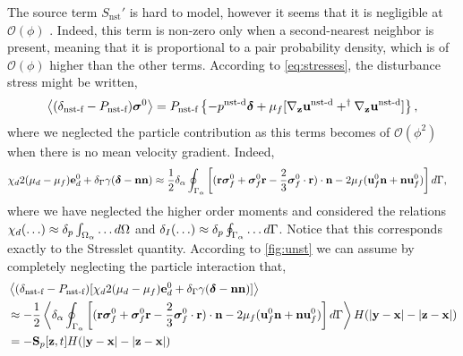 The source term $S_\text{nst}'$ is hard to model, however it seems that it is negligible at $\mathcal{O}(\phi)$ \citet{zhang2021ensemble}. 
Indeed, this term is non-zero only when a second-nearest neighbor is present, meaning that it is proportional to a pair probability density, which is of $\mathcal{O}(\phi)$ higher than the other terms. 
According to \ref{eq:stresses}, the disturbance stress might be written, 
\begin{equation}
    \left<(\delta_\text{nst-f} - P_\text{nst-f}) \bm\sigma^0\right>
    =
    P_\text{nst-f}\left\{
        -p^\text{nst-d}\bm\delta 
        + \mu_f [{\mathbf{\nabla}_\textbf{z}} \textbf{u}^\text{nst-d}+^\dagger{\mathbf{\nabla}_\textbf{z}} \textbf{u}^\text{nst-d}]
    \right\},
\end{equation}
where we  neglected the particle contribution as this terms becomes of $\mathcal{O}(\phi^2)$ when there is no mean velocity gradient. 
Indeed, 
\begin{align}
    {\chi_d  2 (\mu_d-\mu_f)\textbf{e}_d^0 
    + \delta_\Gamma \gamma (\bm\delta - \textbf{nn})}
    &\approx
    \frac{1}{2}
     \delta_\alpha\oint_{\Gamma_{\alpha}} 
        \left[(\textbf{r}\bm\sigma_f^0 
        + \bm\sigma_f^0 \textbf{r}
        - \frac{2}{3}\bm\sigma_f^0 \cdot \textbf{r}
        )\cdot \textbf{n} 
        - 2\mu_f (
            \textbf{u}_f^0 \textbf{n}
            + \textbf{n}\textbf{u}_f^0 
        )\right]
     d\Gamma,
\end{align}
where we have neglected the higher order moments and considered the relations $\chi_d(\ldots) \approx \delta_p \int_{\Omega_{\alpha}} \ldots d\Omega$ and $\delta_I(\ldots) \approx \delta_p \oint_{\Gamma_{\alpha}} \ldots d\Gamma$. 
Notice that this corresponds exactly to the Stresslet quantity. 
According to \ref{fig:unst} we can assume by completely neglecting the particle interaction that, 
\begin{align}
    &\left<(\delta_\text{nst-f} - P_\text{nst-f})[\chi_d  2 (\mu_d-\mu_f)\textbf{e}_d^0 
    + \delta_\Gamma \gamma (\bm\delta - \textbf{nn})]\right>\nonumber \\
    &\approx
    -\frac{1}{2}
     \left<\delta_\alpha \oint_{\Gamma_{\alpha}} 
        \left[(\textbf{r}\bm\sigma_f^0 
        + \bm\sigma_f^0 \textbf{r}
        - \frac{2}{3}\bm\sigma_f^0 \cdot \textbf{r}
        )\cdot \textbf{n} 
        - 2\mu_f (
            \textbf{u}_f^0 \textbf{n}
            + \textbf{n}\textbf{u}_f^0 
        )\right]
     d\Gamma\right>
    H(|\textbf{y}- \textbf{x}| - |\textbf{z} -\textbf{x}|)\nonumber \\
    &= -\textbf{S}_p[\textbf{z},t]
    H(|\textbf{y}- \textbf{x}| - |\textbf{z} -\textbf{x}|)
\end{align}
